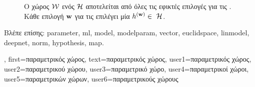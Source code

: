 {{\begin{figure}[H]
\begin{center}
			\end{center} 
			{
			\caption{\foreignlanguage{greek}{Ο}  \foreignlanguage{greek}{χώρος} $\mathcal{W}$ 
				\foreignlanguage{greek}{ενός}   $\mathcal{H}$ \foreignlanguage{greek}{αποτελείται 
				από όλες τις εφικτές επιλογές για τις} . \foreignlanguage{greek}{Κάθε επιλογή ${\bf w}$ για τις} 
				 \foreignlanguage{greek}{επιλέγει μία}   
				$\hypothesis^{(\weights)} \in \hypospace$.
				 \label{fig_param_space_dict}} }
			\end{figure}
			\foreignlanguage{greek}{Βλέπε επίσης:} \gls{parameter}, \gls{ml}, \gls{model}, \gls{modelparam}, \gls{vector}, \gls{euclidspace}, 
			\gls{linmodel}, \gls{deepnet}, \gls{norm}, \gls{hypothesis}, \gls{map}.},
		first={\foreignlanguage{greek}{παραμετρικός χώρος}},
		text={\foreignlanguage{greek}{παραμετρικός χώρος}},
		user1={\foreignlanguage{greek}{παραμετρικός χώρος}}, %
		user2={\foreignlanguage{greek}{παραμετρικού χώρου}}, %
		user3={\foreignlanguage{greek}{παραμετρικό χώρο}}, %
		user4={\foreignlanguage{greek}{παραμετρικοί χώροι}}, %
		user5={\foreignlanguage{greek}{παραμετρικών χώρων}}, %
		user6={\foreignlanguage{greek}{παραμετρικούς χώρους}} %
}%

